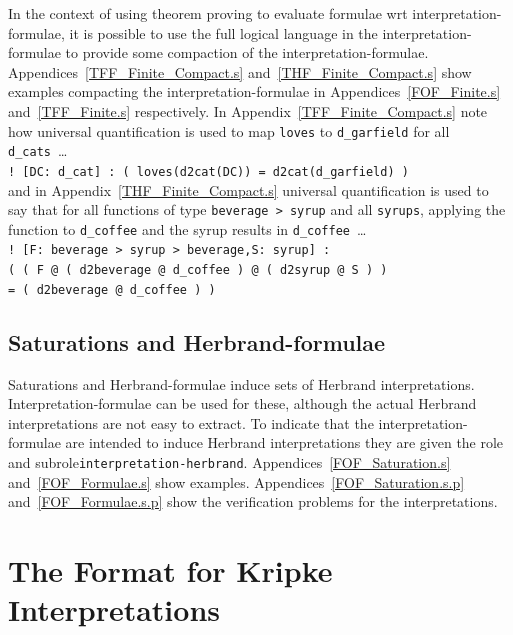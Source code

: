 \documentclass{easychair}
\newcommand{\smalltt}[1]{\small \texttt{#1}}
\begin{document}
In the context of using theorem proving to evaluate formulae wrt interpretation-formulae, it is 
possible to use the full logical language in the interpretation-formulae to provide some 
compaction of the interpretation-formulae.
Appendices~\ref{TFF_Finite_Compact.s} and~\ref{THF_Finite_Compact.s} show examples compacting the
interpretation-formulae in Appendices~\ref{FOF_Finite.s} and~\ref{TFF_Finite.s} respectively.
In Appendix~\ref{TFF_Finite_Compact.s} note how universal quantification is used to map
{\tt loves} to {\tt d\_garfield} for all {\tt d\_cats}~\ldots \\
\hspace*{0.5cm}\smalltt{! [DC: d\_cat] : ( loves(d2cat(DC)) = d2cat(d\_garfield) )} \\
and in Appendix~\ref{THF_Finite_Compact.s} universal quantification is used to say that for all
functions of type {\tt beverage > syrup} and all {\tt syrups}, applying the function to
{\tt d\_coffee} and the syrup results in {\tt d\_coffee}~\ldots \\
\hspace*{0.5cm}\smalltt{! [F: beverage > syrup > beverage,S: syrup] :} \\
\hspace*{0.8cm}\smalltt{( ( F @ ( d2beverage @ d\_coffee ) @ ( d2syrup @ S ) )} \\
\hspace*{0.8cm}\smalltt{= ( d2beverage @ d\_coffee ) )}

\subsection{Saturations and Herbrand-formulae}
\label{NewHerbrand}

Saturations and Herbrand-formulae induce sets of Herbrand interpretations.
Interpretation-formulae can be used for these, although the actual Herbrand interpretations are
not easy to extract.
To indicate that the interpretation-formulae are intended to induce Herbrand interpretations they
are given the role and subrole{\tt interpretation-herbrand}.
Appendices~\ref{FOF_Saturation.s} and~\ref{FOF_Formulae.s} show examples.
Appendices~\ref{FOF_Saturation.s.p} and~\ref{FOF_Formulae.s.p} show the verification problems for 
the interpretations.

\section{The Format for Kripke Interpretations}
\label{NewKripke}
 
\end{document}
